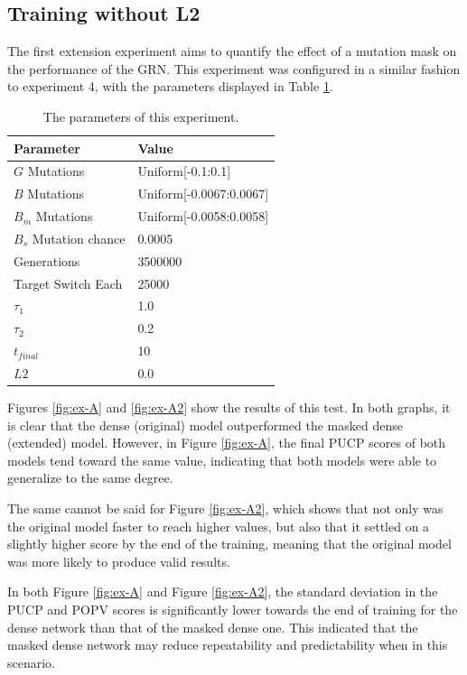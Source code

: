 \documentclass[twocolumn,a4paper,11pt]{article}
\begin{document}
    \subsection{Training without L2}

    The first extension experiment aims to quantify the effect of a mutation mask on the performance of the GRN. This experiment was configured in a similar fashion to experiment 4, with the parameters displayed in Table \ref{tbl:exex1-param}.

    \begin{table}[h]
        \centering
        \begin{tabular}{l|l}
        Parameter & Value \\ \hline
        $G$ Mutations & Uniform[-0.1:0.1] \\
        $B$ Mutations & Uniform[-0.0067:0.0067] \\
        $B_m$ Mutations & Uniform[-0.0058:0.0058] \\
        $B_s$ Mutation chance & 0.0005 \\
        Generations & 3500000 \\
        Target Switch Each & 25000 \\
        $\tau_1$ & 1.0 \\
        $\tau_2$ & 0.2 \\
        $t_{final}$ & 10 \\
        $L2$ & 0.0 \\
        \end{tabular}
        \caption{The parameters of this experiment.} \label{tbl:exex1-param}
    \end{table}

    Figures \ref{fig:ex-A} and \ref{fig:ex-A2} show the results of this test. In both graphs, it is clear that the dense (original) model outperformed the masked dense (extended) model. However, in Figure \ref{fig:ex-A}, the final PUCP scores of both models tend toward the same value, indicating that both models were able to generalize to the same degree.
    
    The same cannot be said for Figure \ref{fig:ex-A2}, which shows that not only was the original model faster to reach higher values, but also that it settled on a slightly higher score by the end of the training, meaning that the original model was more likely to produce valid results.

    In both Figure \ref{fig:ex-A} and Figure \ref{fig:ex-A2}, the standard deviation in the PUCP and POPV scores is significantly lower towards the end of training for the dense network than that of the masked dense one. This indicated that the masked dense network may reduce repeatability and predictability when in this scenario.
\end{document}
